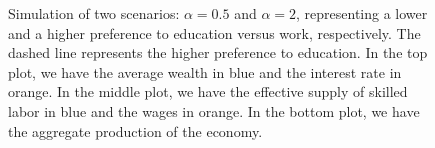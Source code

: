     \begin{figure}[ht]
        \centering
        \caption{\footnotesize Simulation of two scenarios: $\alpha = 0.5$ and  $\alpha = 2$, representing a lower and a higher preference to education versus work, respectively. The dashed line represents the higher preference to education. In the top plot, we have the average wealth in blue and the interest rate in orange. In the middle plot, we have the effective supply of skilled labor in blue and the wages in orange. In the bottom plot, we have the aggregate production of the economy. }
        \label{fig:mfg_simulations}
    \end{figure}